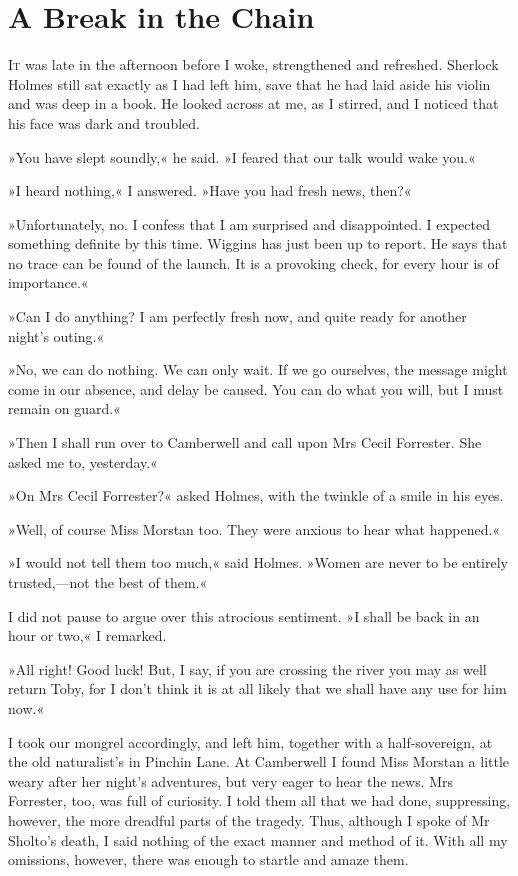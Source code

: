 \chapter{A Break in the Chain}
\lettrine[lines=4]{I}{t} was late in the afternoon before I woke, strengthened and refreshed. Sherlock Holmes still sat exactly as I had left him, save that he had laid aside his violin and was deep in a book. He looked across at me, as I stirred, and I noticed that his face was dark and troubled.

»You have slept soundly,« he said. »I feared that our talk would wake you.«

»I heard nothing,« I answered. »Have you had fresh news, then?«

»Unfortunately, no. I confess that I am surprised and disappointed. I expected something definite by this time. Wiggins has just been up to report. He says that no trace can be found of the launch. It is a provoking check, for every hour is of importance.«

»Can I do anything? I am perfectly fresh now, and quite ready for another night's outing.«

»No, we can do nothing. We can only wait. If we go ourselves, the message might come in our absence, and delay be caused. You can do what you will, but I must remain on guard.«

»Then I shall run over to Camberwell and call upon Mrs Cecil Forrester. She asked me to, yesterday.«

»On Mrs Cecil Forrester?« asked Holmes, with the twinkle of a smile in his eyes.

»Well, of course Miss Morstan too. They were anxious to hear what happened.«

»I would not tell them too much,« said Holmes. »Women are never to be entirely trusted,—not the best of them.«

I did not pause to argue over this atrocious sentiment. »I shall be back in an hour or two,« I remarked.

»All right! Good luck! But, I say, if you are crossing the river you may as well return Toby, for I don't think it is at all likely that we shall have any use for him now.«

I took our mongrel accordingly, and left him, together with a half-sovereign, at the old naturalist's in Pinchin Lane. At Camberwell I found Miss Morstan a little weary after her night's adventures, but very eager to hear the news. Mrs Forrester, too, was full of curiosity. I told them all that we had done, suppressing, however, the more dreadful parts of the tragedy. Thus, although I spoke of Mr Sholto's death, I said nothing of the exact manner and method of it. With all my omissions, however, there was enough to startle and amaze them.

